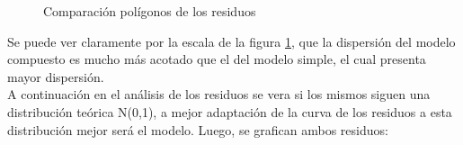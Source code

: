\begin{figure}[h]
\centering
{}%
\hspace{0.25cm}%
\caption{Comparación polígonos de los residuos}
\label{poligonos_comparativa}
\end{figure}


Se puede ver claramente por la escala de la figura \ref{poligonos_comparativa}, que la dispersión del modelo compuesto es mucho más acotado que el del modelo simple, el cual presenta mayor dispersión.\\

A continuación en el análisis de los residuos se vera si los mismos siguen una distribución teórica N(0,1), a mejor adaptación de la curva de los residuos a esta distribución mejor será el modelo.
Luego, se grafican ambos residuos:


\newpage

